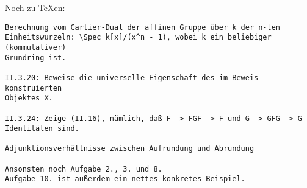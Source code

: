 \documentclass{uebblatt}
\begin{document}
Noch zu \TeX{}en:

\begin{verbatim}Berechnung vom Cartier-Dual der affinen Gruppe über k der n-ten
Einheitswurzeln: \Spec k[x]/(x^n - 1), wobei k ein beliebiger (kommutativer)
Grundring ist.

II.3.20: Beweise die universelle Eigenschaft des im Beweis konstruierten
Objektes X.

II.3.24: Zeige (II.16), nämlich, daß F -> FGF -> F und G -> GFG -> G
Identitäten sind.

Adjunktionsverhältnisse zwischen Aufrundung und Abrundung

Ansonsten noch Aufgabe 2., 3. und 8.
Aufgabe 10. ist außerdem ein nettes konkretes Beispiel.
\end{verbatim}
\end{document}

